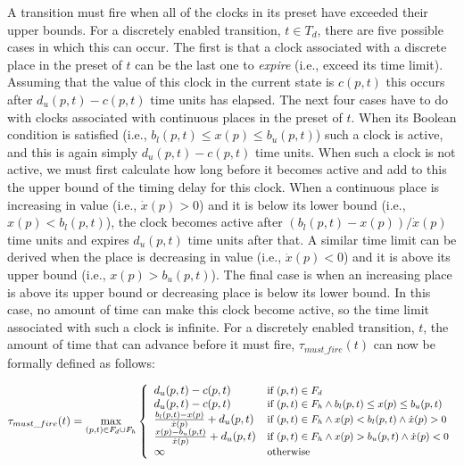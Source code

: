 \documentclass[11pt,times]{article}
\begin{document}
A transition must fire when all of the clocks in its preset have exceeded 
their upper bounds.  For a discretely enabled transition, $t \in T_d$, there
are five possible cases in which this can occur.  The first is that a clock
associated with a discrete place in the preset of $t$ can be the last one to 
{\em expire} (i.e., exceed its time limit).  Assuming that the value of this
clock in the current state is $c(p,t)$ this occurs after $d_u(p,t) - c(p,t)$
time units has elapsed.  The next four cases have to do with clocks 
associated with continuous places in the preset of $t$.  When its Boolean
condition is satisfied (i.e., $b_l(p, t) \leq x(p) \leq b_u(p, t)$) such a 
clock is active, and this is again simply $d_u(p,t) - c(p,t)$ time units.
When such a clock is not active, we must first calculate how long before it
becomes active and add to this the upper bound of the timing delay for this
clock.  When a continuous place is increasing in value (i.e., $\dot{x}(p) > 0$)
and it is below its lower bound (i.e., $x(p) < b_l(p,t)$), the clock becomes 
active after $(b_l(p,t)-x(p))/\dot{x}(p)$ time units and expires $d_u(p,t)$
time units after that.  A similar time limit can be derived when the place is 
decreasing in value (i.e., $\dot{x}(p) < 0$) and it is above its upper bound 
(i.e., $x(p) > b_u(p,t)$).  The final case is when an increasing place 
is above its upper bound or decreasing place is below its lower bound.  In this
case, no amount of time can make this clock become active, so the time limit
associated with such a clock is infinite.  For a discretely enabled transition,
$t$, the amount of time that can advance before it must fire,
$\tau_{must\_fire}(t)$ can now be formally defined as follows:

\[\tau_{must\_fire}(t) = \max_{(p, t) \in F_d \cup F_h} \left\{
    \begin{array}{ll}
      d_u(p, t) - c(p, t) & \mbox{\small if $(p, t) \in F_d$} \\
      d_u(p, t) - c(p, t) & \mbox{\small if $(p, t) \in F_h \wedge
      b_l(p, t) \leq x(p) \leq b_u(p, t)$} \\
      \frac{b_l(p, t)-x(p)}{\dot{x}(p)} + d_u(p, t) &
      \mbox{\small if $(p,t) \in F_h \wedge x(p) < b_l(p,t) \wedge \dot{x}(p)
      > 0$}\\
      \frac{x(p)-b_u(p,t)}{\dot{x}(p)} + d_u(p, t) &
      \mbox{\small if $(p,t) \in F_h \wedge x(p) > b_u(p,t) \wedge \dot{x}(p) <
      0$}\\
      \infty & \mbox{\small otherwise}
    \end{array}
    \right.\]
\end{document}
